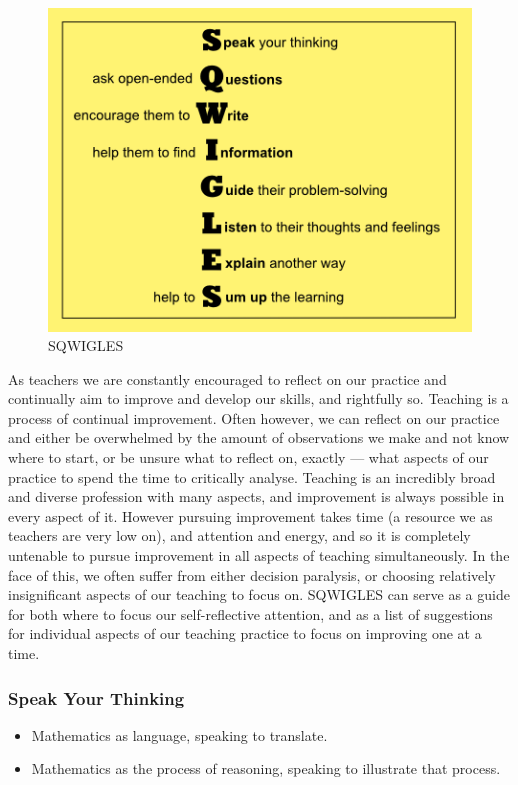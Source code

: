 \documentclass[twoside,12pt,a4paper]{report}
\begin{document}
\begin{figure}[ht]
\centering
\includegraphics{./files/sqwigles.png}
\caption{SQWIGLES \label{fig:sqwigles}}
\end{figure}

As teachers we are constantly encouraged to reflect on our practice and continually aim to improve and develop our skills, and rightfully so. Teaching is a process of continual improvement. Often however, we can reflect on our practice and either be overwhelmed by the amount of observations we make and not know where to start, or be unsure what to reflect on, exactly --- what aspects of our practice to spend the time to critically analyse. Teaching is an incredibly broad and diverse profession with many aspects, and improvement is always possible in every aspect of it. However pursuing improvement takes time (a resource we as teachers are very low on), and attention and energy, and so it is completely untenable to pursue improvement in all aspects of teaching simultaneously. In the face of this, we often suffer from either decision paralysis, or choosing relatively insignificant aspects of our teaching to focus on. SQWIGLES can serve as a guide for both where to focus our self-reflective attention, and as a list of suggestions for individual aspects of our teaching practice to focus on improving one at a time.

\subsubsection{Speak Your Thinking}

\begin{itemize}
	\item Mathematics as language, speaking to translate.
	\item Mathematics as the process of reasoning, speaking to illustrate that process.
\end{itemize}
\end{document}
